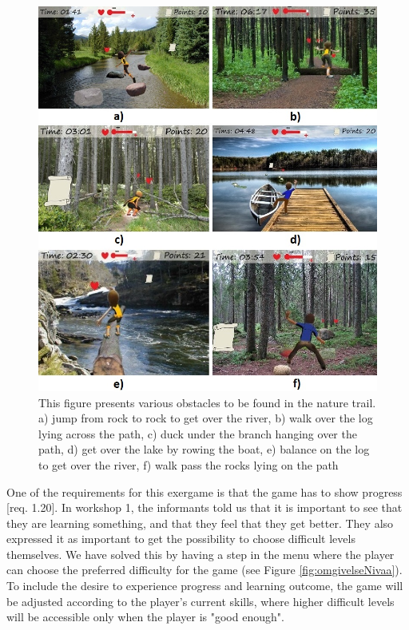 \begin{figure} [H]
\centering
\includegraphics[scale=0.57]{hindringerEng.jpg}
\caption[Nature trail - obstacles]{This figure presents various obstacles to be found in the nature trail. a) jump from rock to rock to get over the river, b) walk over the log lying across the path, c) duck under the branch hanging over the path, d) get over the lake by rowing the boat, e) balance on the log to get over the river, f) walk pass the rocks lying on the path}
\label{fig:hindring}
\end{figure}

One of the requirements for this exergame is that the game has to show progress [req. 1.20]. In workshop 1, the informants told us that it is important to see that they are learning something, and that they feel that they get better. They also expressed it as important to get the possibility to choose difficult levels themselves. We have solved this by having a step in the menu where the player can choose the preferred difficulty for the game (see Figure \ref{fig:omgivelseNivaa}). To include the desire to experience progress and learning outcome, the game will be adjusted according to the player's current skills, where higher difficult levels will be accessible only when the player is "good enough". 

